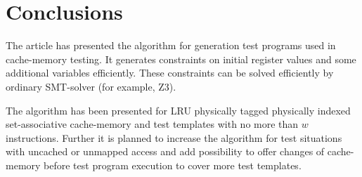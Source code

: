 \documentclass[times, 10pt,twocolumn]{article}
\begin{document}
\section{Conclusions}
The article has presented the algorithm for generation test programs
used in cache-memory testing. It generates constraints on initial
register values and some additional variables efficiently. These
constraints can be solved efficiently by ordinary SMT-solver (for
example, Z3).

The algorithm has been presented for LRU physically tagged
physically indexed set-associative cache-memory and test templates
with no more than $w$ instructions. Further it is planned to
increase the algorithm for test situations with uncached or unmapped
access and add possibility to offer changes of cache-memory before
test program execution to cover more test templates.




\end{document}
